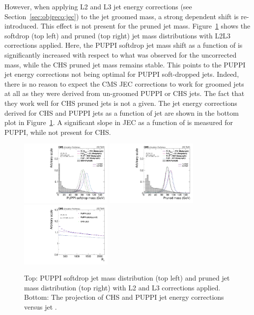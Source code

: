 However, when applying L2 and L3 jet energy corrections (see Section~\ref{sec:objreco:jec}) to the jet groomed mass, a strong \PT dependent shift is re-introduced. This effect is not present for the pruned jet mass. Figure~\ref{fig:searchII:wtagmass} shows the softdrop (top left) and pruned (top right) jet mass distributions with L2L3 corrections applied. Here, the PUPPI softdrop jet mass shift as a function of \PT is significantly increased with respect to what was observed for the uncorrected mass, while the CHS pruned jet mass remains stable. This points to the PUPPI jet energy corrections not being optimal for PUPPI soft-dropped jets. Indeed, there is no reason to expect the CMS JEC corrections to work for groomed jets at all as they were derived from un-groomed PUPPI or CHS jets. The fact that they work well for CHS pruned jets is not a given. The jet energy corrections derived for CHS and PUPPI jets as a function of jet \PT are shown in the bottom plot in Figure~\ref{fig:searchII:wtagmass}. A significant slope in JEC as a function of \PT is measured for PUPPI, while not present for CHS.
\begin{figure}[h!]
\centering
\includegraphics[width=0.4\textwidth]{figures/analysis/search2/AN-16-235/plots/gen_SoftdropMass.pdf}
\includegraphics[width=0.4\textwidth]{figures/analysis/search2/AN-16-235/plots/gen_PrunedMass.pdf}\\
\includegraphics[width=0.4\textwidth]{figures/analysis/search2/AN-16-235/plots/JECvsPT.pdf}
\caption{Top: PUPPI softdrop jet mass distribution (top left) and pruned jet mass distribution (top right) with L2 and L3 corrections applied. Bottom: The projection of CHS and PUPPI jet energy corrections versus jet \PT.}
\label{fig:searchII:wtagmass}
\end{figure}

